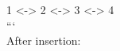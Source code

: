 \documentclass[preview]{standalone}
\begin{document}
1 <-> 2 <-> 3 <-> 4\\```\\After insertion:\\
\end{document}
